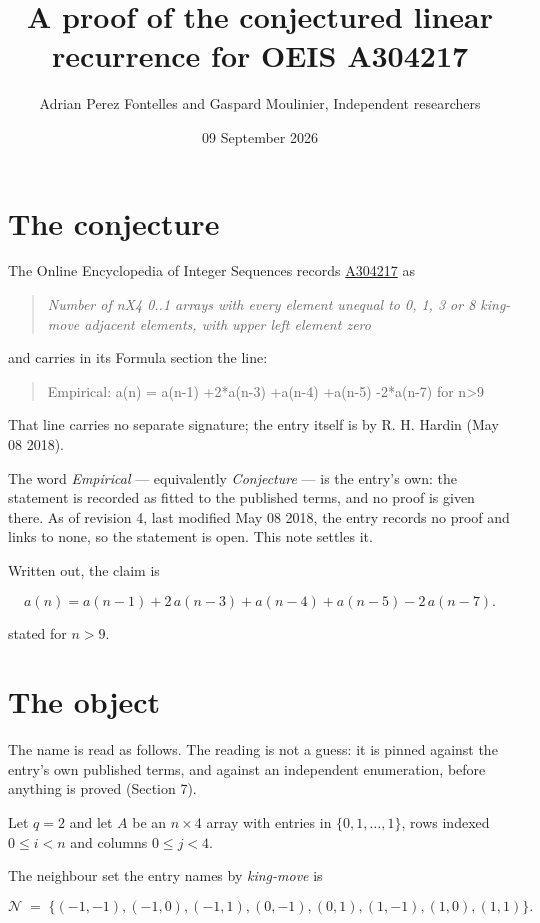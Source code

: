 \documentclass[11pt]{article}
\title{A proof of the conjectured linear recurrence for OEIS A304217}
\author{Adrian Perez Fontelles and Gaspard Moulinier, Independent researchers}
\date{09 September 2026}
\theoremstyle{definition}
\begin{document}
\maketitle
\section{The conjecture}

The Online Encyclopedia of Integer Sequences records \href{https://oeis.org/A304217}{A304217} as

\begin{quote}\itshape Number of nX4 0..1 arrays with every element unequal to 0, 1, 3 or 8 king-move adjacent elements, with upper left element zero\end{quote}

and carries in its Formula section the line:

\begin{quote}\ttfamily Empirical: a(n) = a(n-1) +2*a(n-3) +a(n-4) +a(n-5) -2*a(n-7) for n>9\end{quote}

That line carries no separate signature; the entry itself is by R. H. Hardin (May 08 2018).

The word {\itshape Empirical} --- equivalently {\itshape Conjecture} --- is the entry's own: the statement is recorded as fitted to the published terms, and no proof is given there. As of revision 4, last modified May 08 2018, the entry records no proof and links to none, so the statement is open. This note settles it.

Written out, the claim is

\[a(n) = a(n-1) + 2\,a(n-3) + a(n-4) + a(n-5) - 2\,a(n-7).\]

stated for $n > 9$.

\section{The object}

The name is read as follows. The reading is not a guess: it is pinned against the entry's own published terms, and against an independent enumeration, before anything is proved (Section 7).

Let $q = 2$ and let $A$ be an $n \times 4$ array with entries in $\{0,1,\dots,1\}$, rows indexed $0 \le i < n$ and columns $0 \le j < 4$.

The neighbour set the entry names by {\itshape king-move} is

\[\mathcal{N} \;=\; \{(-1,-1), (-1,0), (-1,1), (0,-1), (0,1), (1,-1), (1,0), (1,1)\}.\]
\end{document}
